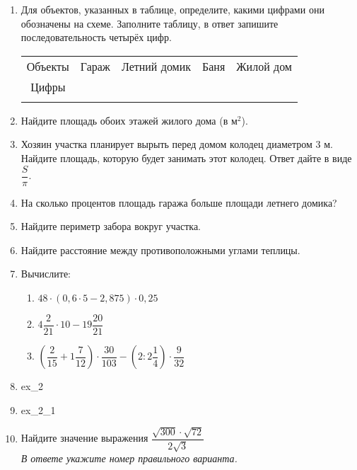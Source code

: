 \documentclass[12pt, a4paper]{article}
\begin{document}
	\begin{enumerate}
		\item Для объектов, указанных в таблице, определите, какими цифрами они обозначены на схеме. Заполните таблицу, в ответ запишите последовательность четырёх цифр.
		\begin{table}[!h]
			\renewcommand{\arraystretch}{1.4} %
			\centering
			\begin{tabular}{|c|c|c|c|c|}
				\tend
				Объекты & Гараж & Летний домик & Баня & Жилой дом \\
				\tend
				\thead Цифры & & & & \\
				\tend
			\end{tabular}
		\end{table}
		\item Найдите площадь обоих этажей жилого дома (в м$^2$).
		\item Хозяин участка планирует вырыть перед домом колодец диаметром $3$ м. Найдите площадь, которую будет занимать этот колодец. Ответ дайте в виде $\dfrac{S}{\pi}$.
		\item На сколько процентов площадь гаража больше площади летнего домика?
		\item Найдите периметр забора вокруг участка.
		\item Найдите расстояние между противоположными углами теплицы.
		\item Вычислите:
		\begin{multicols}{2}
			\begin{enumerate}[label=\asbuk*)]
				\item $48\cdot(0,6\cdot5-2,875)\cdot0,25$
				\item $4\dfrac{2}{21}\cdot10-19\dfrac{20}{21}$
				\item $\left(\dfrac{2}{15}+1\dfrac{7}{12}\right)\cdot\dfrac{30}{103}-\left(2:2\dfrac{1}{4}\right)\cdot\dfrac{9}{32}$
			\end{enumerate}
		\end{multicols}
	\newpage
		\item {ex_2}
		\item {ex_2_1}
		\item Найдите значение выражения $\dfrac{\sqrt{300}\cdot\sqrt{72}}{2\sqrt{3}}$\\
		\textit{В ответе укажите номер правильного варианта.}
		\begin{multicols}{4}

\end{multicols}
\end{enumerate}
\end{document}
